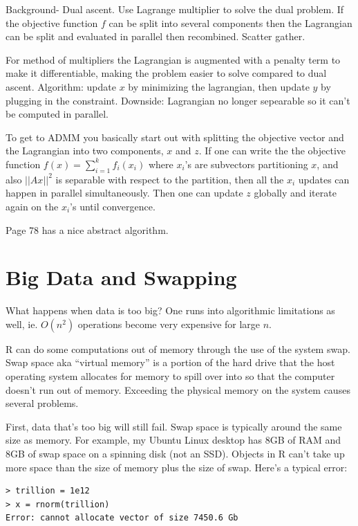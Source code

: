 \documentclass[12pt]{article}
\begin{document}
Background- Dual ascent. Use Lagrange multiplier to solve the dual problem.
If the objective function $f$ can be split into several components then the
Lagrangian can be split and evaluated in parallel then recombined. Scatter
gather.

For method of multipliers the Lagrangian is augmented with a penalty term
to make it differentiable, making the problem easier to solve compared to
dual ascent. Algorithm: update $x$ by minimizing the lagrangian, then
update $y$ by plugging in the constraint. Downside: Lagrangian no longer
sepearable so it can't be computed in parallel.

To get to ADMM you basically start out with splitting the objective vector
and the Lagrangian into two components, $x$ and $z$. If one can write the
the objective function $f(x) = \sum_{i = 1}^k f_i (x_i)$ where $x_i$'s are
subvectors partitioning $x$, and also $||Ax||^2$ is separable with respect
to the partition, then all the $x_i$ updates can happen in parallel
simultaneously. Then one can update $z$ globally and iterate again on the
$x_i$'s until convergence.

Page 78 has a nice
abstract algorithm. 

\section{Big Data and Swapping}

What happens when data is too big? One runs into algorithmic limitations as
well, ie. $O(n^2)$ operations become very expensive for large $n$.

R can do some computations out of memory through the use of the system
swap. Swap space aka ``virtual memory'' is a portion of the hard drive that
the host operating system allocates for memory to spill over into so that
the computer doesn't run out of memory.  Exceeding the physical memory on
the system causes several problems.

First, data that's too big will still fail. Swap space is typically
around the same size as memory. For example, my Ubuntu Linux desktop has
8GB of RAM and 8GB of swap space on a spinning disk (not an SSD). Objects
in R can't take up more space than the size of memory plus the size of
swap. Here's a typical error:

\begin{verbatim}
> trillion = 1e12
> x = rnorm(trillion)
Error: cannot allocate vector of size 7450.6 Gb
\end{verbatim}
\end{document}
